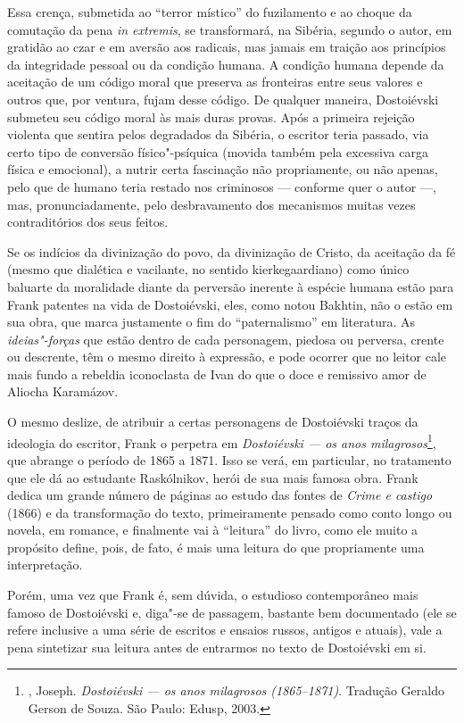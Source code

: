 Essa crença, submetida ao ``terror místico'' do fuzilamento e ao choque
da comutação da pena \emph{in extremis}, se transformará, na Sibéria,
segundo o autor, em gratidão ao czar e em aversão aos radicais, mas
jamais em traição aos princípios da integridade pessoal ou da condição
humana. A condição humana depende da aceitação de um código moral que
preserva as fronteiras entre seus valores e outros que, por ventura,
fujam desse código. De qualquer maneira, Dostoiévski submeteu seu código
moral às mais duras provas. Após a primeira rejeição violenta que
sentira pelos degradados da Sibéria, o escritor teria passado, via certo
tipo de conversão físico"-psíquica (movida também pela excessiva carga
física e emocional), a nutrir certa fascinação não propriamente, ou não
apenas, pelo que de humano teria restado nos criminosos --- conforme quer
o autor ---, mas, pronunciadamente, pelo desbravamento dos mecanismos
muitas vezes contraditórios dos seus feitos.

Se os indícios da divinização do povo, da divinização de Cristo, da
aceitação da fé (mesmo que dialética e vacilante, no sentido
kierkegaardiano) como único baluarte da moralidade diante da perversão
inerente à espécie humana estão para Frank patentes na vida de
Dostoiévski, eles, como notou Bakhtin, não o estão em sua obra, que
marca justamente o fim do ``paternalismo'' em literatura. As
\emph{ideias"-forças} que estão dentro de cada personagem, piedosa
ou perversa, crente ou descrente, têm o mesmo direito à expressão, e
pode ocorrer que no leitor cale mais fundo a rebeldia iconoclasta de
Ivan do que o doce e remissivo amor de Aliocha Karamázov.

O mesmo deslize, de atribuir a certas personagens de Dostoiévski traços
da ideologia do escritor, Frank o perpetra em \emph{Dostoiévski --- os
anos milagrosos}\footnote{, Joseph. \emph{Dostoiévski --- os anos
  milagrosos (1865--1871)}. Tradução Geraldo Gerson de Souza. São Paulo:
  Edusp, 2003.}, que abrange o período de 1865 a 1871. Isso se verá, em
particular, no tratamento que ele dá ao estudante Raskólnikov, herói de
sua mais famosa obra. Frank dedica um grande número de páginas ao estudo
das fontes de \emph{Crime e castigo} (1866) e da transformação do texto,
primeiramente pensado como conto longo ou novela, em romance, e
finalmente vai à ``leitura'' do livro, como ele muito a propósito
define, pois, de fato, é mais uma leitura do que propriamente uma
interpretação.

Porém, uma vez que Frank é, sem dúvida, o estudioso contemporâneo mais
famoso de Dostoiévski e, diga"-se de passagem, bastante bem documentado
(ele se refere inclusive a uma série de escritos e ensaios russos,
antigos e atuais), vale a pena sintetizar sua leitura antes de entrarmos
no texto de Dostoiévski em si.

